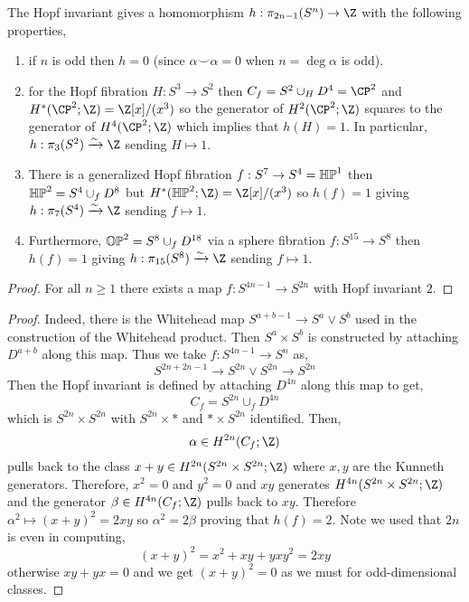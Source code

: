 \documentclass[12pt]{extarticle}
\begin{document}
\begin{prop}
The Hopf invariant gives a homomorphism $h : \pi_{2n - 1}(S^n) \to \Z$ with the following properties,
\begin{enumerate}
\item if $n$ is odd then $h = 0$ (since $\alpha \smile \alpha = 0$ when $n = \deg{\alpha}$ is odd).
\item for the Hopf fibration $H : S^3 \to S^2$ then $C_f = S^2 \cup_H D^4 = \CP^2$ and $H^*(\CP^2; \Z) = \Z[x]/(x^3)$ so the generator of $H^2(\CP^2; \Z)$ squares to the generator of $H^4(\CP^2; \Z)$ which implies that $h(H) = 1$. In particular, $h : \pi_3(S^2) \xrightarrow{\sim} \Z$ sending $H \mapsto 1$. 
\item There is a generalized Hopf fibration $f : S^7 \to S^4 = \mathbb{HP}^1$ then $\mathbb{HP}^2 = S^4 \cup_f D^8$ but $H^*(\HP^2; \Z) = \Z[x]/(x^3)$ so $h(f) = 1$ giving $h : \pi_7(S^4) \xrightarrow{\sim} \Z$ sending $f \mapsto 1$.
\item Furthermore, $\mathbb{OP}^2 = S^8 \cup_f D^{18}$ via a sphere fibration $f : S^{15} \to S^8$ then $h(f) = 1$ giving $h : \pi_{15}(S^8) \xrightarrow{\sim} \Z$ sending $f \mapsto 1$.
\end{enumerate}
\end{prop}

\begin{proof}
For all $n \ge 1$ there exists a map $f : S^{4n - 1} \to S^{2n}$ with Hopf invariant $2$.
\end{proof}

\begin{proof}
Indeed, there is the Whitehead map $S^{a+b-1} \to S^a \vee S^b$ used in the construction of the Whitehead product. Then $S^a \times S^b$ is constructed by attaching $D^{a+b}$ along this map. Thus we take $f : S^{4n-1} \to S^n$ as,
\[ S^{2n+2n-1} \to S^{2n} \vee S^{2n} \to S^{2n} \]
Then the Hopf invariant is defined by attaching $D^{4n}$ along this map to get,
\[ C_f = S^{2n} \cup_f D^{4n} \]
which is $S^{2n} \times S^{2n}$ with $S^{2n} \times *$ and $* \times S^{2n}$ identified. Then,
\[ \alpha \in H^{2n}(C_f;\Z) \]
pulls back to the class $x + y \in H^{2n}(S^{2n} \times S^{2n}; \Z)$ where $x,y$ are the Kunneth generators. Therefore, $x^2 = 0$ and $y^2 = 0$ and $xy$ generates $H^{4n}(S^{2n} \times S^{2n}; \Z)$ and the generator $\beta \in H^{4n}(C_f; \Z)$ pulls back to $xy$. Therefore $\alpha^2 \mapsto (x+y)^2 = 2 xy$ so $\alpha^2 = 2 \beta$ proving that $h(f) = 2$. Note we used that $2n$ is even in computing,
\[ (x+y)^2 = x^2 + xy + yx y^2 = 2 xy \]
otherwise $xy + yx = 0$ and we get $(x+y)^2 = 0$ as we must for odd-dimensional classes.
\end{proof}
\end{document}
